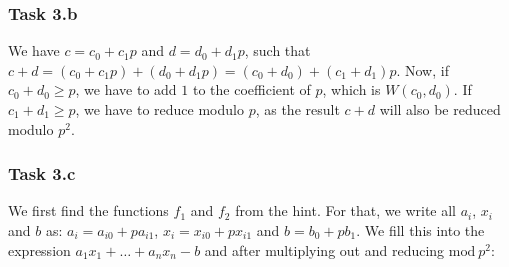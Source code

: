 \documentclass{article}
\begin{document}
\subsubsection*{Task 3.b}
We have $c = c_0 + c_1p$ and $d = d_0 + d_1p$, such that $c + d = (c_0 + c_1p) +
(d_0 + d_1p) = (c_0 + d_0) + (c_1 + d_1)p$. Now, if $c_0 + d_0 \ge  p$, we have
to add $1$ to the coefficient of $p$, which is $W(c_0, d_0)$. If $c_1 + d_1 \ge
p$, we have to reduce modulo $p$, as the result $c + d$ will also be reduced
modulo $p^2$.

\subsubsection*{Task 3.c}

We first find the functions $f_1$ and $f_2$ from the hint. For that, we write
all $a_i$, $x_i$ and $b$ as: $a_i = a_{i0} + p a_{i1}$, $x_i = x_{i0} + p
x_{i1}$ and $b = b_0 + p b_1$. We fill this into the expression  $a_1 x_1 +
\dots + a_n x_n - b$ and after multiplying out and reducing $\text{mod}\ p^2$:
\end{document}
